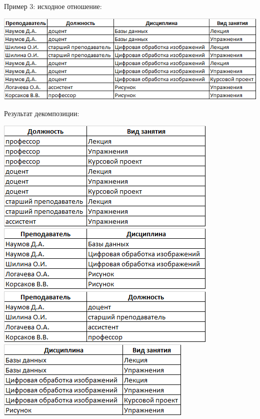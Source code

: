 \documentclass{beamer}
\begin{document}
\begin{frame}
Пример 3: исходное отношение:
\begin{center}
\includegraphics[scale=0.5]{images/ex-rasp-19.png}
\end{center}
Результат декомпозиции:
\begin{center}
\includegraphics[scale=0.5]{images/ex-rasp-20.png}
\includegraphics[scale=0.5]{images/ex-rasp-21.png}
\includegraphics[scale=0.5]{images/ex-rasp-22.png}
\includegraphics[scale=0.5]{images/ex-rasp-23.png}
\end{center}
\end{frame}
\end{document}
